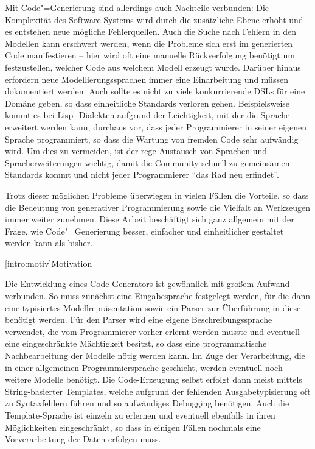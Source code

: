 \documentclass[11pt, a4paper, bibgerm]{scrbook}
\newcommand\lsection{}
\newcommand{\cgen}{Code"=Generierung}
\begin{document}
Mit \cgen{} sind allerdings auch Nachteile verbunden: Die Komplexität des
Software-Systems wird durch die zusätzliche Ebene erhöht und es
entstehen neue mögliche Fehlerquellen. Auch die Suche nach Fehlern in
den Modellen kann erschwert werden, wenn die Probleme sich erst im
generierten Code manifestieren -- hier wird oft eine manuelle
Rückverfolgung benötigt um festzustellen, welcher Code aus welchem
Modell erzeugt wurde. Darüber hinaus erfordern neue
Modellierungssprachen immer eine Einarbeitung und müssen dokumentiert
werden. Auch sollte es nicht zu viele konkurrierende DSLs für eine
Domäne geben, so dass einheitliche Standards verloren
gehen. Beispielsweise kommt es bei Lisp \cite{Lisp}-Dialekten aufgrund
der Leichtigkeit, mit der die Sprache erweitert werden kann, durchaus
vor, dass jeder Programmierer in seiner eigenen Sprache programmiert, so
dass die Wartung von fremden Code sehr aufwändig wird. Um dies zu
vermeiden, ist der rege Austausch von Sprachen und Spracherweiterungen
wichtig, damit die Community schnell zu gemeinsamen Standards kommt
und nicht jeder Programmierer "`das Rad neu erfindet"'.

Trotz dieser möglichen Probleme überwiegen in vielen Fällen die
Vorteile, so dass die Bedeutung von generativer Programmierung sowie die
Vielfalt an Werkzeugen immer weiter zunehmen. Diese Arbeit beschäftigt
sich ganz allgemein mit der Frage, wie \cgen{} besser, einfacher und
einheitlicher gestaltet werden kann als bisher.

\lsection[intro:motiv]{Motivation}

Die Entwicklung eines Code-Generators ist gewöhnlich mit großem Aufwand
verbunden. So muss zunächst eine Eingabesprache festgelegt werden, für
die dann eine typisiertes Modellrepräsentation sowie ein Parser zur
Überführung in diese benötigt werden. Für den Parser wird eine eigene
Beschreibungssprache verwendet, die vom Programmierer vorher erlernt
werden musste und eventuell eine eingeschränkte Mächtigkeit besitzt, so
dass eine programmatische Nachbearbeitung der Modelle nötig werden
kann. Im Zuge der Verarbeitung, die in einer allgemeinen
Programmiersprache geschieht, werden eventuell noch weitere Modelle
benötigt. Die Code-Erzeugung selbst erfolgt dann meist mittels
String-basierter Templates, welche aufgrund der fehlenden
Ausgabetypisierung oft zu Syntaxfehlern führen und so aufwändiges
Debugging benötigen. Auch die Template-Sprache ist einzeln zu erlernen
und eventuell ebenfalls in ihren Möglichkeiten eingeschränkt, so dass in
einigen Fällen nochmals eine Vorverarbeitung der Daten erfolgen muss.
\end{document}
